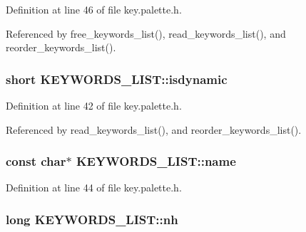 Definition at line 46 of file key.\-palette.\-h.



Referenced by free\-\_\-keywords\-\_\-list(), read\-\_\-keywords\-\_\-list(), and reorder\-\_\-keywords\-\_\-list().

\hypertarget{struct_k_e_y_w_o_r_d_s___l_i_s_t_ad1079e4adbde20c2dbea75b17be761ab}{
\subsubsection[{isdynamic}]{\setlength{\rightskip}{0pt plus 5cm}short K\-E\-Y\-W\-O\-R\-D\-S\-\_\-\-L\-I\-S\-T\-::isdynamic}}\label{struct_k_e_y_w_o_r_d_s___l_i_s_t_ad1079e4adbde20c2dbea75b17be761ab}


Definition at line 42 of file key.\-palette.\-h.



Referenced by read\-\_\-keywords\-\_\-list(), and reorder\-\_\-keywords\-\_\-list().

\hypertarget{struct_k_e_y_w_o_r_d_s___l_i_s_t_ac4d58ddf79266bc3ca07a0d8aa8b92d6}{
\subsubsection[{name}]{\setlength{\rightskip}{0pt plus 5cm}const char$\ast$ K\-E\-Y\-W\-O\-R\-D\-S\-\_\-\-L\-I\-S\-T\-::name}}\label{struct_k_e_y_w_o_r_d_s___l_i_s_t_ac4d58ddf79266bc3ca07a0d8aa8b92d6}


Definition at line 44 of file key.\-palette.\-h.

\hypertarget{struct_k_e_y_w_o_r_d_s___l_i_s_t_a96a1aa3a1e3282a0029b55245f7bc697}{
\subsubsection[{nh}]{\setlength{\rightskip}{0pt plus 5cm}long K\-E\-Y\-W\-O\-R\-D\-S\-\_\-\-L\-I\-S\-T\-::nh}}\label{struct_k_e_y_w_o_r_d_s___l_i_s_t_a96a1aa3a1e3282a0029b55245f7bc697}


